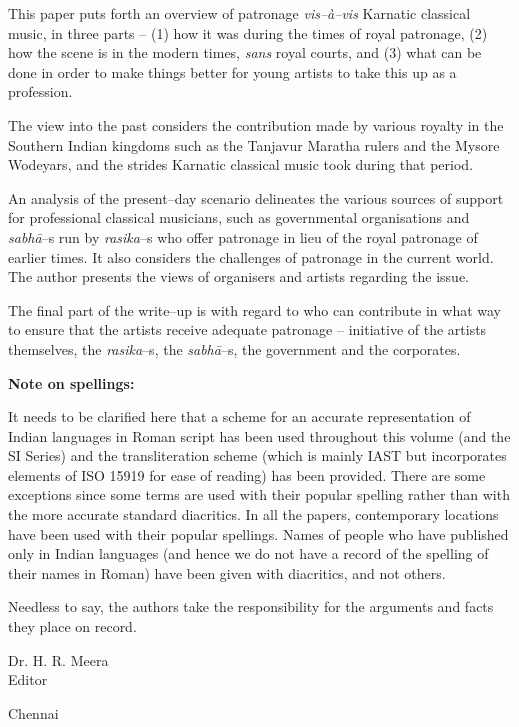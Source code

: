 This paper puts forth an overview of patronage \textit{vis–à–vis} Karnatic classical music, in three parts – (1) how it was during the times of royal patronage, (2) how the scene is in the modern times, \textit{sans} royal courts, and (3) what can be done in order to make things better for young artists to take this up as a profession.

The view into the past considers the contribution made by various royalty in the Southern Indian kingdoms such as the Tanjavur Maratha rulers and the Mysore Wodeyars, and the strides Karnatic classical music took during that period.

An analysis of the present–day scenario delineates the various sources of support for professional classical musicians, such as governmental organisations and \textit{sabhā}–s run by \textit{rasika}–s who offer patronage in lieu of the royal patronage of earlier times. It also considers the challenges of patronage in the current world. The author presents the views of organisers and artists regarding the issue.

The final part of the write–up is with regard to who can contribute in what way to ensure that the artists receive adequate patronage – initiative of the artists themselves, the \textit{rasika}–s, the \textit{sabhā}–s, the government and the corporates.

\delimiter

\textbf{Note on spellings: }

It needs to be clarified here that a scheme for an accurate representation of Indian languages in Roman script has been used throughout this volume (and the SI Series) and the transliteration scheme (which is mainly IAST but incorporates elements of ISO 15919 for ease of reading) has been provided. There are some exceptions since some terms are used with their popular spelling rather than with the more accurate standard diacritics. In all the papers, contemporary locations have been used with their popular spellings. Names of people who have published only in Indian languages (and hence we do not have a record of the spelling of their names in Roman) have been given with diacritics, and not others.

Needless to say, the authors take the responsibility for the arguments and facts they place on record.

\begin{flushright}
Dr. H. R. Meera\\ Editor
\end{flushright}

Chennai

\theendnotes

